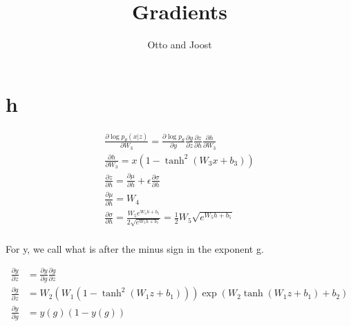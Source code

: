 \documentclass{article}
\begin{document}
\title{Gradients}
\author{Otto and Joost}
\maketitle

\section{h}
\begin{align*}
	\frac{\partial \log p_\theta (x|z)}{\partial W_3} = \frac{\partial \log p_\theta}{\partial y} \frac{\partial y}{\partial z} \frac{\partial z}{\partial h} \frac{\partial h}{\partial W_3} \\
	\frac{\partial h}{\partial W_3} = x(1-\tanh^2(W_3x+b_3)) \\
	\frac{\partial z}{\partial h} = \frac{\partial \mu}{\partial h} + \epsilon \frac{\partial \sigma}{\partial h} \\
	\frac{\partial \mu}{\partial h} = W_4 \\
	\frac{\partial \sigma}{\partial h} = \frac{W_5 e^{W_5h + b_5}}{2 \sqrt{e^{W_5h + b_5}}}
	=  \frac{1}{2} W_5 \sqrt{e^{W_5h + b_5}} \\
\end{align*}

For y, we call what is after the minus sign in the exponent g.

\begin{align*}
	\frac{\partial y}{\partial z} &= \frac{\partial y}{\partial g} \frac{\partial g}{\partial z} \\
	\frac{\partial g}{\partial z} &= W_2(W_1(1- \tanh^2(W_1 z + b_1))) \exp(W_2 \tanh(W_1 z + b_1) + b_2) \\
	\frac{\partial y}{\partial g} &= y(g)(1 - y(g))
\end{align*}
\end{document}
